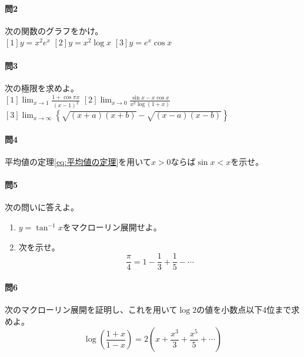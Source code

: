 \documentclass[a4j,dvipdfmx]{jsarticle}
\begin{document}
            \paragraph{問2}次の関数のグラフをかけ。\\
                $[1]y=x^2e^x$\hspace{40mm}
                $[2]y=x^2\log x$\hspace{40mm}
                $[3]y=e^x\cos x$
            \paragraph{問3}次の極限を求めよ。\\
                $\displaystyle[1]\lim_{x\to 1}\frac{1+\cos\pi x}{(x-1)^2}$\hspace{10mm}
                $\displaystyle[2]\lim_{x\to 0}\frac{\sin x-x\cos x}{x^2\log(1+x)}$\hspace{10mm}
                $\displaystyle[3]\lim_{x\to\infty}\left\{\sqrt{(x+a)(x+b)}-\sqrt{(x-a)(x-b)}\right\}$
            \paragraph{問4}平均値の定理\ref{eq:平均値の定理}を用いて$x>0$ならば$\sin x<x$を示せ。

            \paragraph{問5}次の問いに答えよ。
                \begin{enumerate}
                    \item $y=\tan^{-1}x$をマクローリン展開せよ。
                    \item 次を示せ。
                    \begin{equation*}
                        \frac{\pi}{4}=1-\frac{1}{3}+\frac{1}{5}-\cdots
                    \end{equation*}
                \end{enumerate}
            \paragraph{問6}次のマクローリン展開を証明し、これを用いて$\log 2$の値を小数点以下4位まで求めよ。
                \begin{equation*}
                    \log\left(\frac{1+x}{1-x}\right)=2\left(x+\frac{x^3}{3}+\frac{x^5}{5}+\cdots\right)
                \end{equation*}
            
\end{document}
